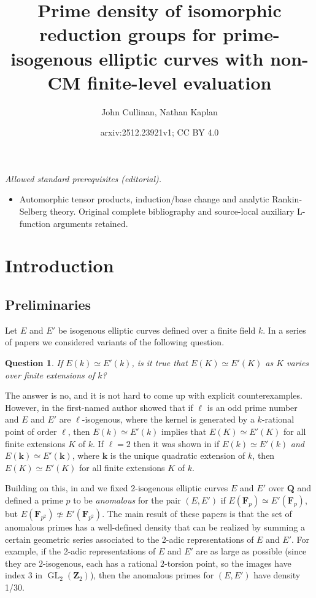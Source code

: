 \documentclass{amsart}
\title{Prime density of isomorphic reduction groups for prime-isogenous elliptic curves with non-CM finite-level evaluation}
\author{John Cullinan, Nathan Kaplan}
\date{arxiv:2512.23921v1; CC BY 4.0}
\newcommand{\Z}{\mathbf{Z}}
\newcommand{\F}{\mathbf{F}}
\newcommand{\Q}{\mathbf{Q}}
\newcommand{\GL}{\operatorname{GL}}
\numberwithin{equation}{section}
\theoremstyle{plain}
\newtheorem{qu}{Question}
\theoremstyle{remark}
\begin{document}
\maketitle
\noindent\textit{Allowed standard prerequisites (editorial).}\begin{itemize}
\item Automorphic tensor products, induction/base change and analytic Rankin-Selberg theory. Original complete bibliography and source-local auxiliary L-function arguments retained.
\end{itemize}\medskip
\section{Introduction} \label{intro}

\subsection{Preliminaries} Let $E$ and $E'$ be isogenous elliptic curves defined over a finite field $k$.  In a series of papers \cite{cullinan1, cullinan2, ck, rnt} we considered variants of the following question.

\begin{qu}
If $E(k) \simeq E'(k)$, is it true that $E(K) \simeq E'(K)$ as $K$ varies over finite extensions of $k$? 
\end{qu}

The answer is no, and it is not hard to come up with explicit counterexamples.  However, in  \cite{cullinan1} the first-named author showed that if $\ell$ is an odd prime number and $E$ and $E'$ are $\ell$-isogenous, where the kernel is generated by a $k$-rational point of order $\ell$, then $E(k) \simeq E'(k)$ implies that $E(K) \simeq E'(K)$ for all finite extensions $K$ of $k$.   If $\ell=2$ then it was shown in \cite{cullinan2} if $E(k) \simeq E'(k)$ \emph{and} $E(\mathbf{k}) \simeq E'(\mathbf{k})$, where $\mathbf{k}$ is the unique quadratic extension of $k$, then $E(K) \simeq E'(K)$ for all finite extensions $K$ of $k$.

Building on this, in \cite{ck} and \cite{rnt} we fixed 2-isogenous elliptic curves $E$ and $E'$ over $\Q$ and defined a prime $p$ to be \emph{anomalous} for the pair $(E,E')$ if $E(\F_p) \simeq E'(\F_p)$, but $E(\F_{p^2}) \not \simeq E'(\F_{p^2})$.  The main result of these papers is that the set of anomalous primes has a well-defined density that can be realized by summing a certain geometric series associated to the 2-adic representations of $E$ and $E'$.  For example, if the 2-adic representations of $E$ and $E'$ are as large as possible (since they are $2$-isogenous, each has a rational $2$-torsion point, so the images have index $3$ in $\GL_{2}(\Z_2)$), then the anomalous primes for $(E,E')$ have density 1/30. 
\end{document}
